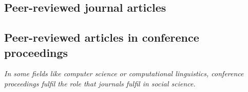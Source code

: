 \documentclass[11pt,a4paper,sans]{moderncv}
\begin{document}






\subsection{Peer-reviewed journal articles}

\makeatletter
\long{}
\def\endthebibliography{\end{etaremune}}
\def\@bibitem#1{%
  \item \if@filesw\immediate\write\@auxout{\string\bibcite{#1}{\the\value{enumi}}}\fi\ignorespaces
}
\makeatother



\subsection{Peer-reviewed articles in conference proceedings}
\emph{In some fields like computer science or computational linguistics, conference proceedings fulfil the role that journals fulfil in social science.}

\makeatletter
\long{}
\def\endthebibliography{\end{etaremune}}
\def\@bibitem#1{%
  \item \if@filesw\immediate\write\@auxout{\string\bibcite{#1}{\the\value{enumi}}}\fi\ignorespaces
}
\makeatother
\end{document}

